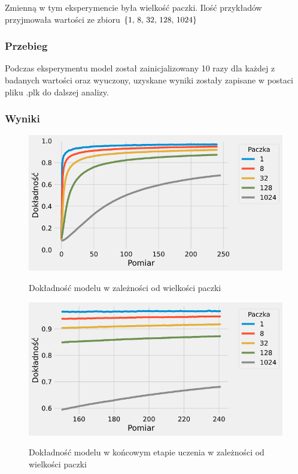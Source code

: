 \documentclass{article}
\begin{document}
Zmienną w tym eksperymencie była wielkość paczki. Ilość przykładów przyjmowała wartości ze zbioru \(\{$1, 8, 32, 128, 1024$\}\)
\subsubsection*{Przebieg}

Podczas eksperymentu model został zainicjalizowany 10 razy dla każdej z badanych wartości oraz wyuczony, uzyskane wyniki zostały zapisane w postaci pliku .plk do dalszej analizy.

\subsubsection*{Wyniki}
\begin{figure}[H]
	\centering
	\caption{Dokładność modelu w zależności od wielkości paczki}
	\includegraphics[width=\textwidth]{batch_acc.png}
	\label{fig:res21}
\end{figure}
\begin{figure}[H]
	\centering
	\caption{Dokładność modelu w końcowym etapie uczenia w zależności od wielkości paczki}
	\includegraphics[width=\textwidth]{batch_acc_zoom.png}
	\label{fig:res22}
\end{figure}
\end{document}
